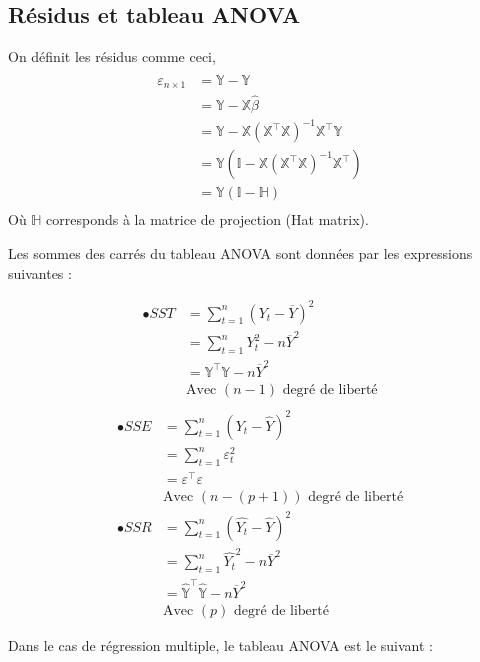 \documentclass[11pt,french]{report}
\begin{document}
\subsection{Résidus et tableau ANOVA}
On définit les résidus comme ceci,
\begin{align*}
\varepsilon_{n \times 1} &= \mathbb{Y} - \hat{\mathbb{Y}} \\
&= \mathbb{Y} - \mathbb{X} \hat{\beta} \\
&= \mathbb{Y} - \mathbb{X}(\mathbb{X}^\intercal\mathbb{X})^{-1}\mathbb{X}^\intercal\mathbb{Y} \\
&= \mathbb{Y} (\mathbb{I} - \mathbb{X}(\mathbb{X}^\intercal\mathbb{X})^{-1}\mathbb{X}^\intercal) \\
&= \mathbb{Y} (\mathbb{I} - \mathbb{H}) \\
\end{align*}
Où $\mathbb{H}$ corresponds à la matrice de projection (Hat matrix).\newline

Les sommes des carrés du tableau ANOVA sont données par les expressions suivantes :

\begin{align*}
\bullet SST &= \displaystyle\sum_{t=1}^n(Y_t - \overline{Y})^2 \\
&= \displaystyle\sum_{t=1}^nY_t^2 - n\overline{Y}^2 \\
&= \mathbb{Y}^\intercal\mathbb{Y} - n \overline{Y}^2 \\
& \text{Avec $(n-1)$ degré de liberté} \\
\end{align*}
\begin{align*}
\bullet SSE &= \displaystyle\sum_{t=1}^n(Y_t - \hat{Y})^2 \\
&= \displaystyle\sum_{t=1}^n\varepsilon_t^2 \\
&= \mathbb{\varepsilon}^\intercal\mathbb{\varepsilon}\\
& \text{Avec $(n-(p+1))$ degré de liberté} \\
\bullet SSR &= \displaystyle\sum_{t=1}^n(\hat{Y_t} - \hat{Y})^2 \\
&= \displaystyle\sum_{t=1}^n\hat{Y_t}^2 - n\overline{Y}^2 \\
&= \mathbb{\hat{Y}}^\intercal\mathbb{\hat{Y}} - n \overline{Y}^2\\
& \text{Avec $(p)$ degré de liberté}
\end{align*}

\bigskip
Dans le cas de régression multiple, le tableau ANOVA est le suivant :
\end{document}
